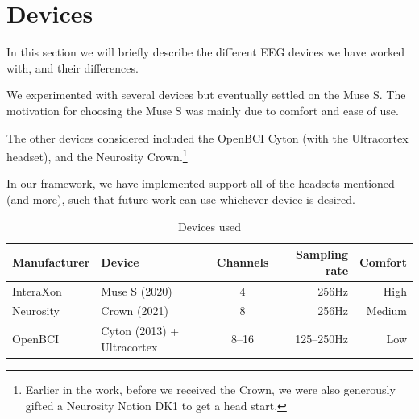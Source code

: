 \section{Devices}
    
    In this section we will briefly describe the different EEG devices we have worked with, and their differences.

    We experimented with several devices but eventually settled on the Muse S. The motivation for choosing the Muse S was mainly due to comfort and ease of use. 

    The other devices considered included the OpenBCI Cyton (with the Ultracortex headset), and the Neurosity Crown.\footnote{Earlier in the work, before we received the Crown, we were also generously gifted a Neurosity Notion DK1 to get a head start.} 

    In our framework, we have implemented support all of the headsets mentioned (and more), such that future work can use whichever device is desired.

    \vspace{0.5cm}

    \begin{table}[H]
        \centering
        \begin{tabular}{llcrr}
            \toprule
            Manufacturer
            & Device
            & Channels
            & Sampling rate
            & Comfort
            \\
            \midrule
            InteraXon
            & Muse S (2020)
            & 4
            & 256Hz
            & High
            \\
            Neurosity
            & Crown (2021)
            & 8
            & 256Hz
            & Medium
            \\
            OpenBCI
            & Cyton (2013) + Ultracortex
            & 8--16
            & 125--250Hz
            & Low
            \\
            \bottomrule
        \end{tabular}
        \caption{Devices used}\label{table:devices}
    \end{table}

    \vspace{0.5cm}

